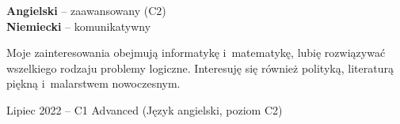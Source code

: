 \documentclass[8pt]{developercv} %
\begin{document}
\begin{minipage}[t]{0.3\textwidth}
  \vspace{-\baselineskip}


  \textbf{Angielski} -- zaawansowany (C2)\\
  \textbf{Niemiecki} -- komunikatywny
\end{minipage}
\hfill
\begin{minipage}[t]{0.3\textwidth}
  \vspace{-\baselineskip}


  Moje zainteresowania obejmują informatykę i~matematykę,
  lubię rozwiązywać wszelkiego rodzaju problemy logiczne.
  Interesuję się również polityką, literaturą piękną i~malarstwem nowoczesnym.
\end{minipage}
\hfill
\begin{minipage}[t]{0.35\textwidth}
  \vspace{-\baselineskip}

  Lipiec 2022 -- C1 Advanced (Język angielski, poziom C2)
\end{minipage}

\end{document}
